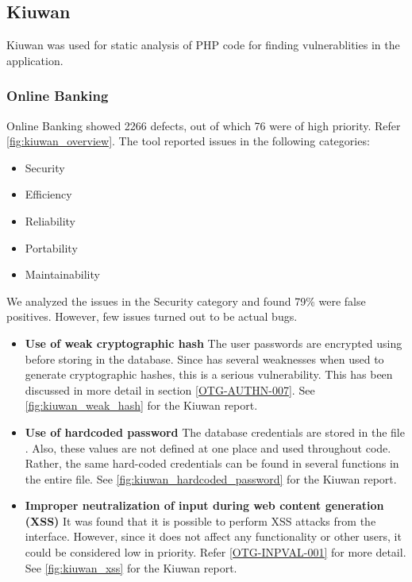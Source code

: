 \subsection{Kiuwan}
Kiuwan was used for static analysis of PHP code for finding vulnerablities in the application.
\subsubsection{Online Banking}
Online Banking showed 2266 defects, out of which 76 were of high priority. Refer \ref{fig:kiuwan_overview}. The tool reported issues in the following categories:
\begin{itemize}
    \item Security
    \item Efficiency
    \item Reliability
    \item Portability
    \item Maintainability
\end{itemize}
We analyzed the issues in the Security category and found 79\% were false positives. However, few issues turned out to be actual bugs.
\begin{itemize}
	\item \textbf{Use of weak cryptographic hash} The user passwords are encrypted using  before storing in the database. Since  has several weaknesses when used to generate cryptographic hashes, this is a serious vulnerability. This has been discussed in more detail in section \ref{OTG-AUTHN-007}. See \ref{fig:kiuwan_weak_hash} for the Kiuwan report.
	\item \textbf{Use of hardcoded password} The database credentials are stored in the file . Also, these values are not defined at one place and used throughout code. Rather, the same hard-coded credentials can be found in several functions in the entire file. See \ref{fig:kiuwan_hardcoded_password} for the Kiuwan report.
	\item \textbf{Improper neutralization of input during web content generation (XSS)} It was found that it is possible to perform XSS attacks from the  interface. However, since it does not affect any functionality or other users, it could be considered low in priority. Refer \ref{OTG-INPVAL-001} for more detail. See \ref{fig:kiuwan_xss} for the Kiuwan report.
\end{itemize}

